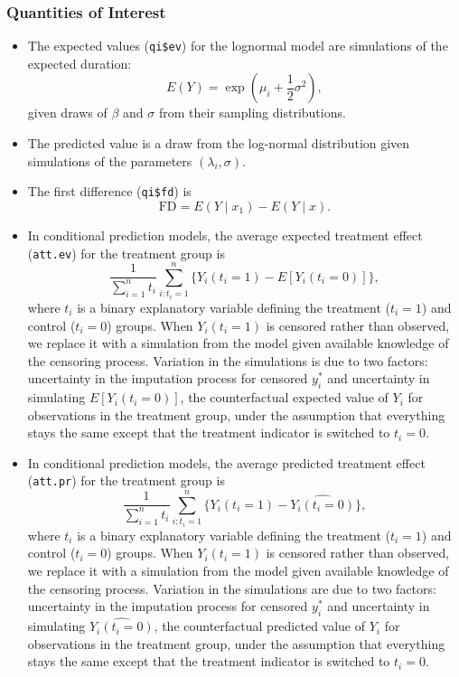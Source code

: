 \subsubsection{Quantities of Interest} 

\begin{itemize}
\item The expected values ({\tt qi\$ev}) for the lognormal model are
  simulations of the expected duration:  
\begin{equation*}
E(Y) =  \exp\left(\mu_i + \frac{1}{2}\sigma^2 \right),
\end{equation*}
given draws of $\beta$ and $\sigma$ from their sampling distributions. 

\item The predicted value is a draw from the log-normal distribution
  given simulations of the parameters $(\lambda_i, \sigma)$.

\item The first difference ({\tt qi\$fd}) is
\begin{equation*}
\textrm{FD} = E(Y \mid x_1) - E(Y \mid x). 
\end{equation*}

\item In conditional prediction models, the average expected treatment
  effect ({\tt att.ev}) for the treatment group is \begin{equation*}
  \frac{1}{\sum_{i=1}^n t_i}\sum_{i:t_i=1}^n \{ Y_i(t_i=1) - E[Y_i(t_i=0)] \}, \end{equation*} where $t_i$ is a binary explanatory variable
  defining the treatment ($t_i=1$) and control ($t_i=0$) groups. When
  $Y_i(t_i=1)$ is censored rather than observed, we replace it with a
  simulation from the model given available knowledge of the censoring
  process.  Variation in the simulations is due to two factors:
  uncertainty in the imputation process for censored $y_i^*$ and
  uncertainty in simulating $E[Y_i(t_i=0)]$, the counterfactual
  expected value of $Y_i$ for observations in the treatment group,
  under the assumption that everything stays the same except that the
  treatment indicator is switched to $t_i=0$.

\item In conditional prediction models, the average predicted treatment
  effect ({\tt att.pr}) for the treatment group is 
\begin{equation*}
  \frac{1}{\sum_{i=1}^n t_i} \sum_{i:t_i=1}^n \{  Y_i(t_i=1) -
\widehat{Y_i(t_i=0)} \}, 
\end{equation*} 
where $t_i$ is a binary explanatory
  variable defining the treatment ($t_i=1$) and control ($t_i=0$)
  groups.  When $Y_i(t_i=1)$ is censored rather than observed, we
  replace it with a simulation from the model given available
  knowledge of the censoring process.  Variation in the simulations
  are due to two factors: uncertainty in the imputation process for
  censored $y_i^*$ and uncertainty in simulating
  $\widehat{Y_i(t_i=0)}$, the counterfactual predicted value of $Y_i$
  for observations in the treatment group, under the assumption that
  everything stays the same except that the treatment indicator is
  switched to $t_i=0$.

\end{itemize}
